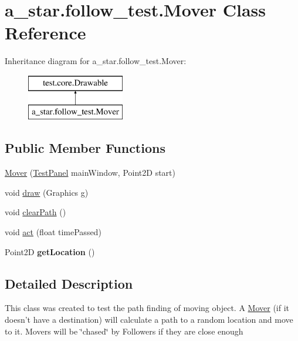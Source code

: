 \hypertarget{classa__star_1_1follow__test_1_1_mover}{\section{a\-\_\-star.\-follow\-\_\-test.\-Mover Class Reference}
\label{classa__star_1_1follow__test_1_1_mover}
}
Inheritance diagram for a\-\_\-star.\-follow\-\_\-test.\-Mover\-:\begin{figure}[H]
\begin{center}
\leavevmode
\includegraphics[height=2.000000cm]{classa__star_1_1follow__test_1_1_mover}
\end{center}
\end{figure}
\subsection*{Public Member Functions}
\begin{DoxyCompactItemize}
\item 
\hyperlink{classa__star_1_1follow__test_1_1_mover_a1ccfcf1738bcc78c85f923873e517c0d}{Mover} (\hyperlink{classtest_1_1core_1_1_test_panel}{Test\-Panel} main\-Window, Point2\-D start)
\item 
void \hyperlink{classa__star_1_1follow__test_1_1_mover_ac197bf1d7788aeffec0e33dfa745c190}{draw} (Graphics g)
\item 
void \hyperlink{classa__star_1_1follow__test_1_1_mover_a90243b495db124b15fba9afc79cbcfcf}{clear\-Path} ()
\item 
void \hyperlink{classa__star_1_1follow__test_1_1_mover_a86591ca1d9f386d394fc6f02cac8f15f}{act} (float time\-Passed)
\item 
\hypertarget{classa__star_1_1follow__test_1_1_mover_a16892b4b0ba3f7bd9296bfe1e0b0fd1e}{Point2\-D {\bfseries get\-Location} ()}\label{classa__star_1_1follow__test_1_1_mover_a16892b4b0ba3f7bd9296bfe1e0b0fd1e}

\end{DoxyCompactItemize}


\subsection{Detailed Description}
This class was created to test the path finding of moving object. A \hyperlink{classa__star_1_1follow__test_1_1_mover}{Mover} (if it doesn't have a destination) will calculate a path to a random location and move to it. Movers will be \char`\"{}chased\char`\"{} by Followers if they are close enough

